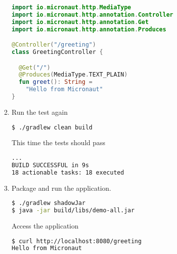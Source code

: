 \begin{enumerate}
\begin{lstlisting}[language=Kotlin]
import io.micronaut.http.MediaType
import io.micronaut.http.annotation.Controller
import io.micronaut.http.annotation.Get
import io.micronaut.http.annotation.Produces

@Controller("/greeting")
class GreetingController {

  @Get("/")
  @Produces(MediaType.TEXT_PLAIN)
  fun greet(): String =
    "Hello from Micronaut"
}
\end{lstlisting}

\item Run the test again

\begin{lstlisting}[language=bash]
$ ./gradlew clean build
\end{lstlisting}

This time the tests should pass

\begin{lstlisting}[language=bash]
...
BUILD SUCCESSFUL in 9s
18 actionable tasks: 18 executed
\end{lstlisting}

\item Package and run the application.

\begin{lstlisting}[language=bash]
$ ./gradlew shadowJar
$ java -jar build/libs/demo-all.jar
\end{lstlisting}

Access the application

\begin{lstlisting}[language=bash]
$ curl http://localhost:8080/greeting
Hello from Micronaut
\end{lstlisting}

\end{enumerate}

